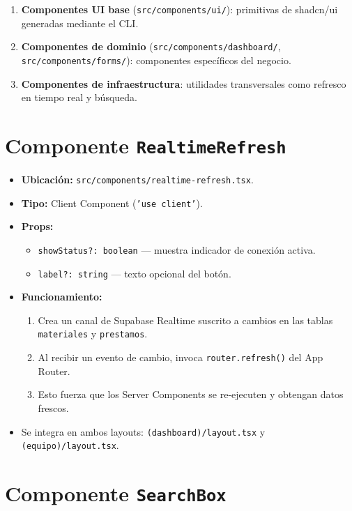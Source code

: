\documentclass[12pt,a4paper,oneside]{report}
\newcommand{\file}[1]{\texttt{\color{cecyteDark}#1}}
\begin{document}
\begin{enumerate}
  \item \textbf{Componentes UI base} (\file{src/components/ui/}): primitivas de shadcn/ui generadas mediante el CLI.
  \item \textbf{Componentes de dominio} (\file{src/components/dashboard/}, \file{src/components/forms/}): componentes específicos del negocio.
  \item \textbf{Componentes de infraestructura}: utilidades transversales como refresco en tiempo real y búsqueda.
\end{enumerate}

\section{Componente \texttt{RealtimeRefresh}}

\begin{itemize}
  \item \textbf{Ubicación:} \file{src/components/realtime-refresh.tsx}.
  \item \textbf{Tipo:} Client Component (\file{'use client'}).
  \item \textbf{Props:}
    \begin{itemize}
      \item \file{showStatus?: boolean} — muestra indicador de conexión activa.
      \item \file{label?: string} — texto opcional del botón.
    \end{itemize}
  \item \textbf{Funcionamiento:}
    \begin{enumerate}
      \item Crea un canal de Supabase Realtime suscrito a cambios en las tablas \file{materiales} y \file{prestamos}.
      \item Al recibir un evento de cambio, invoca \file{router.refresh()} del App Router.
      \item Esto fuerza que los Server Components se re-ejecuten y obtengan datos frescos.
    \end{enumerate}
  \item Se integra en ambos layouts: \file{(dashboard)/layout.tsx} y \file{(equipo)/layout.tsx}.
\end{itemize}

\section{Componente \texttt{SearchBox}}
\end{document}
